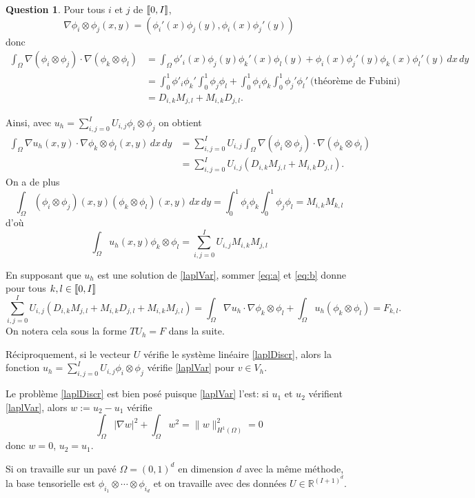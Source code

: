 \documentclass[11pt]{article}
\newcommand{\RR}{\mathbb{R}}
\DeclarePairedDelimiter{\zintcc}{[\![}{]\!]}
\theoremstyle{definition}
\newtheorem{ques}{Question}
\begin{document}
\begin{ques}
Pour tous $i$ et $j$ de $\zintcc{0,I}$,
\[
\nabla \phi_i\otimes\phi_j (x,y) = \left(
\phi_i'(x)\phi_j(y), \phi_i(x)\phi_j'(y)
\right)
\]
donc 
\begin{align*}
\int_{\Omega}\nabla(\phi_i\otimes\phi_j)\cdot\nabla(\phi_k\otimes\phi_l) 
&=
\int_{\Omega} \phi'_i(x)\phi_j(y)\phi_k'(x)\phi_l(y) + \phi_i(x)\phi_j'(y)\phi_k(x)\phi_l'(y)\,dx\,dy \\
&= \int_{0}^{1}\phi'_i\phi_k' \int_0^1\phi_j\phi_l + \int_{0}^{1}\phi_i\phi_k \int_0^1\phi_j'\phi_l' \ \text{(théorème de Fubini)} \\
&= D_{i,k}M_{j,l} + M_{i,k}D_{j,l}.
\end{align*}

Ainsi, avec $u_h = \sum_{i,j=0}^{I}U_{i,j}\phi_i\otimes\phi_j$ on obtient
\begin{align*}\tag{a}\label{eq:a}
\int_{\Omega} \nabla u_h(x,y)\cdot \nabla \phi_k\otimes\phi_l (x,y)\,dx\,dy 
&= \sum_{i,j=0}^{I}U_{i,j} \int_\Omega\nabla(\phi_i\otimes\phi_j)\cdot\nabla(\phi_k\otimes\phi_l) \\
&= \sum_{i,j=0}^{I}U_{i,j} (D_{i,k}M_{j,l}+M_{i,k}D_{j,l}).
\end{align*}
On a de plus
\[
\int_\Omega (\phi_i\otimes\phi_j)(x,y)(\phi_k\otimes\phi_l)(x,y)\,dx\,dy = \int_0^1 \phi_i \phi_k \int_0^1 \phi_j \phi_l = M_{i,k}M_{k,l}
\]
d'où
\begin{equation}\tag{b}\label{eq:b}
\int_\Omega u_h(x,y)\phi_k\otimes\phi_l = \sum_{i,j=0}^{I}U_{i,j}M_{i,k}M_{j,l}
\end{equation}

En supposant que $u_h$ est une solution de \eqref{laplVar}, sommer \eqref{eq:a} et \eqref{eq:b} donne pour tous $k,l\in\zintcc{0,I}$
\begin{equation}\label{laplDiscr}
\sum_{i,j=0}^{I}U_{i,j}(D_{i,k}M_{j,l} + M_{i,k}D_{j,l} + M_{i,k}M_{j,l}) =
\int_\Omega\nabla u_h\cdot \nabla\phi_k\otimes\phi_l + \int_\Omega u_h (\phi_k\otimes\phi_l)
= F_{k,l}.
\end{equation}
On notera cela sous la forme $TU_h = F$ dans la suite.

Réciproquement, si le vecteur $U$ vérifie le système linéaire \eqref{laplDiscr}, alors la fonction $u_h = \sum_{i,j=0}^{I}U_{i,j}\phi_i\otimes\phi_j$ vérifie \eqref{laplVar} pour $v\in V_h$.

Le problème \eqref{laplDiscr} est bien posé puisque \eqref{laplVar} l'est: si $u_1$ et $u_2$ vérifient \eqref{laplVar}, alors $w:= u_2-u_1$ vérifie
\[
\int_\Omega \left|\nabla w\right|^2 + \int_\Omega w^2 = \|w\|_{H^1(\Omega)}^2 = 0
\]
donc $w = 0$, $u_2 = u_1$.

Si on travaille sur un pavé $\Omega = (0,1)^d$ en dimension $d$ avec la même méthode, la base tensorielle est $\phi_{i_1}\otimes\cdots\otimes\phi_{i_d}$ et on travaille avec des données $U \in \RR^{(I+1)^d}$.

\end{ques}
\end{document}
